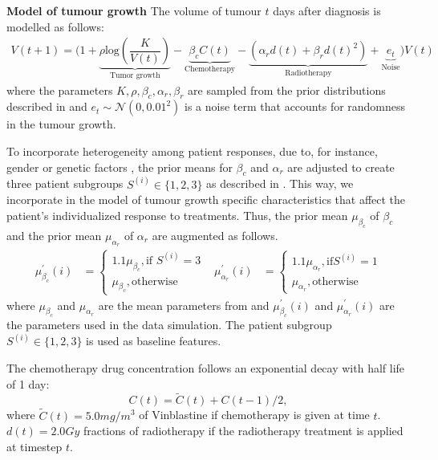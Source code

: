 \documentclass{article} %
\begin{document}
	\textbf{Model of tumour growth} The volume of tumour $t$ days after diagnosis is modelled as follows:
	\begin{equation}
	\begin{aligned}
	V(t+1) =  \Big( 1 + \underbrace{\rho \text{log}(\dfrac{K}{V(t)})}_{\text{Tumor growth}} - \underbrace{\beta_c C(t)}_{\text{Chemotherapy}} - \underbrace{\left(\alpha_r d(t) + \beta_r d(t)^2\right)}_{\text{Radiotherapy}} + \underbrace{e_t}_{\text{Noise}}  \Big)V(t) 
	\end{aligned}
	\end{equation}
	where the parameters $K, \rho, \beta_c, \alpha_r, \beta_r$ are sampled from the prior distributions described in \citep{geng2017prediction} and $e_t \sim \mathcal{N}(0, 0.01^2)$ is a noise term that accounts for randomness in the tumour growth. 
	
	To incorporate heterogeneity among patient responses, due to, for instance, gender or genetic factors \cite{bartsch2007genetic}, the prior means for $\beta_c$ and  $\alpha_r$ are adjusted to create three patient subgroups $S^{(i)} \in \{1, 2, 3\}$ as described in \cite{lim2018forecasting}. This way, we incorporate in the model of tumour growth specific characteristics that affect the patient's individualized response to treatments. Thus, the prior mean $\mu_{\beta_c}$ of $\beta_c$ and the prior mean $\mu_{\alpha_r}$ of $\alpha_r$ are augmented as follows.
	\begin{align}
	    \mu^{\prime}_{\beta_c}(i) &= \begin{cases}
               1.1 \mu_{\beta_c}, \text{if } S^{(i)} = 3 \\
              \mu_{\beta_c}, \text{otherwise}
            \end{cases} & 
         \mu^{\prime}_{\alpha_r}(i) &= \begin{cases}
               1.1 \mu_{\alpha_r}, \text{if} S^{(i)} = 1 \\
              \mu_{\alpha_r}, \text{otherwise}
            \end{cases}
	\end{align}
	where $\mu_{\beta_c}$ and $\mu_{\alpha_r}$ are the mean parameters from \cite{geng2017prediction} and $\mu^{\prime}_{\beta_c}(i)$ and $\mu^{\prime}_{\alpha_r}(i)$ are the parameters used in the data simulation. The patient subgroup $S^{(i)} \in \{1, 2, 3\}$ is used as baseline features.
	
	 The chemotherapy drug concentration follows an exponential decay with half life of 1 day:
	 \begin{equation}
	     C(t) = \tilde{C}(t) + C(t-1)/2,
	 \end{equation}
	 where $ \tilde{C}(t) = 5.0 mg/m^3$ of Vinblastine if chemotherapy is given at time $t$. $d(t) = 2.0 Gy$ fractions of radiotherapy if the radiotherapy treatment is applied at timestep $t$. 
	
\end{document}
